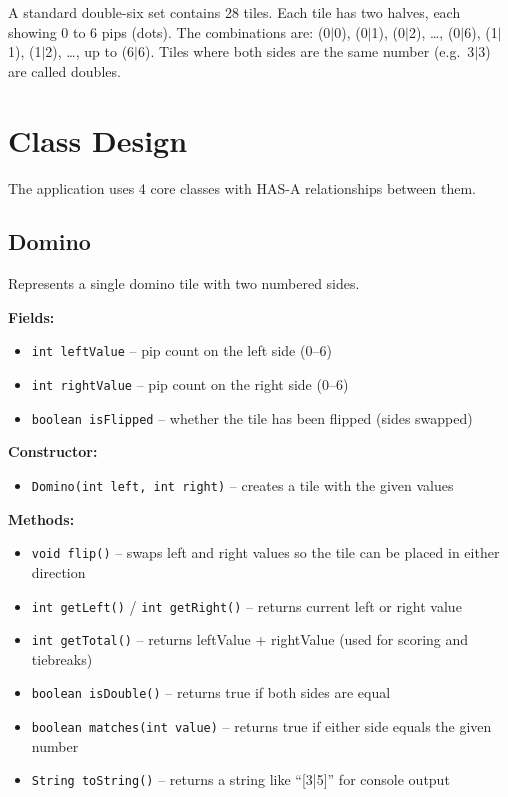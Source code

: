\documentclass[11pt,a4paper]{article}
\begin{document}
A standard double-six set contains 28 tiles. Each tile has two halves, each showing 0 to 6 pips (dots). The combinations are: (0$|$0), (0$|$1), (0$|$2), \ldots, (0$|$6), (1$|$1), (1$|$2), \ldots, up to (6$|$6). Tiles where both sides are the same number (e.g.\ 3$|$3) are called doubles.

\section{Class Design}

The application uses 4 core classes with HAS-A relationships between them.

\subsection{Domino}

Represents a single domino tile with two numbered sides.

\textbf{Fields:}
\begin{itemize}[nosep]
  \item \texttt{int leftValue} -- pip count on the left side (0--6)
  \item \texttt{int rightValue} -- pip count on the right side (0--6)
  \item \texttt{boolean isFlipped} -- whether the tile has been flipped (sides swapped)
\end{itemize}

\textbf{Constructor:}
\begin{itemize}[nosep]
  \item \texttt{Domino(int left, int right)} -- creates a tile with the given values
\end{itemize}

\textbf{Methods:}
\begin{itemize}[nosep]
  \item \texttt{void flip()} -- swaps left and right values so the tile can be placed in either direction
  \item \texttt{int getLeft()} / \texttt{int getRight()} -- returns current left or right value
  \item \texttt{int getTotal()} -- returns leftValue + rightValue (used for scoring and tiebreaks)
  \item \texttt{boolean isDouble()} -- returns true if both sides are equal
  \item \texttt{boolean matches(int value)} -- returns true if either side equals the given number
  \item \texttt{String toString()} -- returns a string like ``[3|5]'' for console output
\end{itemize}
\end{document}
